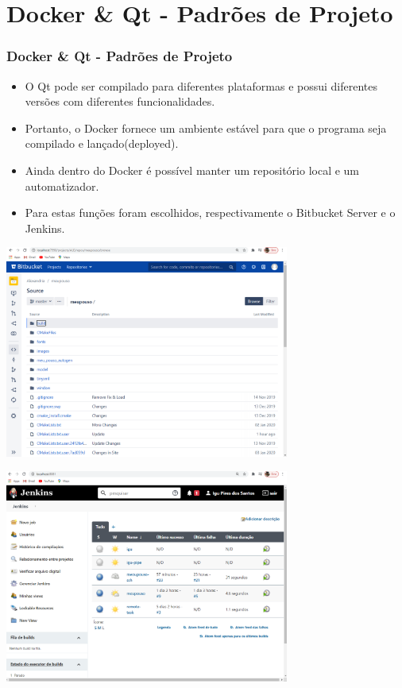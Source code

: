 \documentclass[10pt]{beamer}
\theoremstyle{remark}
\theoremstyle{definition}
\begin{document}
\section{Docker \& Qt - Padrões de Projeto}
\begin{frame}[allowframebreaks]
\frametitle{Docker \& Qt - Padrões de Projeto}

	\begin{itemize}
		\item O Qt pode ser compilado para diferentes plataformas e possui diferentes versões com diferentes funcionalidades.
		
		\item Portanto, o Docker fornece um ambiente estável para que o programa seja compilado e lançado(deployed).
		
		\item Ainda dentro do Docker é possível manter um repositório local e um automatizador.
		
		\item Para estas funções foram escolhidos, respectivamente o Bitbucket Server e o Jenkins.
	\end{itemize}
	
	\framebreak
	
	\begin{center}
		\includegraphics[width=0.7\textwidth]{images/32.png}
	\end{center}
	
	\framebreak
	
	\begin{center}
		\includegraphics[width=0.7\textwidth]{images/37.png}
	\end{center}
	

\end{frame}
\end{document}
